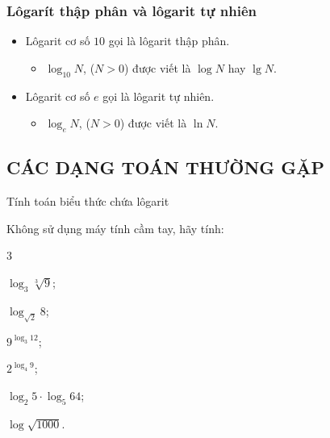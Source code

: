\subsubsection{Lôgarít thập phân và lôgarit tự nhiên}
	\begin{itemize}
			\item [\iconMT]  Lôgarit cơ số $10$ gọi là lôgarit thập phân.
			\begin{itemize}
				\item [\faCheck] $\log_{10}N$, ($N>0$) được viết là $\log N$ hay $\lg N$.
			\end{itemize}
			\item [\iconMT]  Lôgarit cơ số $e$ gọi là lôgarit tự nhiên.
			\begin{itemize}
				\item [\faCheck] $\log_eN$, ($N>0$) được viết là $\ln N$.
			\end{itemize}
	\end{itemize}
\subsection{CÁC DẠNG TOÁN THƯỜNG GẶP}

\begin{dang}{Tính toán biểu thức chứa lôgarit}
\end{dang}

\begin{vd}%
	Không sử dụng máy tính cầm tay, hãy tính:
	\begin{enumEX}[a)]{3}
		\item $\log_3 \sqrt[3]{9}$;
		\item $\log_{\sqrt{2}} 8$;
		\item $9^{\log_3 12}$;
		\item $2^{\log_4 9}$;
		\item $\log_2 5\cdot \log_5 64$;
		\item $ \log \sqrt{1000}$.
	\end{enumEX}
\end{vd} 

